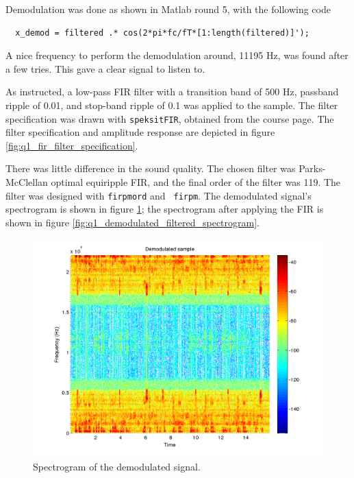 Demodulation was done as shown in Matlab round 5, with the following code
\begin{verbatim}
  x_demod = filtered .* cos(2*pi*fc/fT*[1:length(filtered)]');
\end{verbatim}

A nice frequency to perform the demodulation around, 11195 Hz, was found
after a few tries.  This gave a clear signal to listen to.

As instructed, a low-pass FIR filter with a transition band of 500 Hz,
passband ripple of 0.01, and stop-band ripple of 0.1 was applied to the
sample.  The filter specification was drawn with {\tt speksitFIR},
obtained from the course page.  The filter specification and amplitude
response are depicted in figure \ref{fig:q1_fir_filter_specification}.

There was little difference in the sound quality.  The chosen filter was
Parks-McClellan optimal equiripple FIR, and the final order of the
filter was 119.  The filter was designed with {\tt firpmord} and {\tt
firpm}.  The demodulated signal's spectrogram is shown in
figure \ref{fig:q1_demodulated_spectrogram}; the spectrogram after
applying the FIR is shown in
figure \ref{fig:q1_demodulated_filtered_spectrogram}.

\begin{figure}
  \begin{center}
    \hspace*{-1in}
    \includegraphics[width=180mm]{q1_demodulated_spectrogram}
    \caption{Spectrogram of the demodulated signal. 
    \label{fig:q1_demodulated_spectrogram}}
  \end{center}  
\end{figure}


